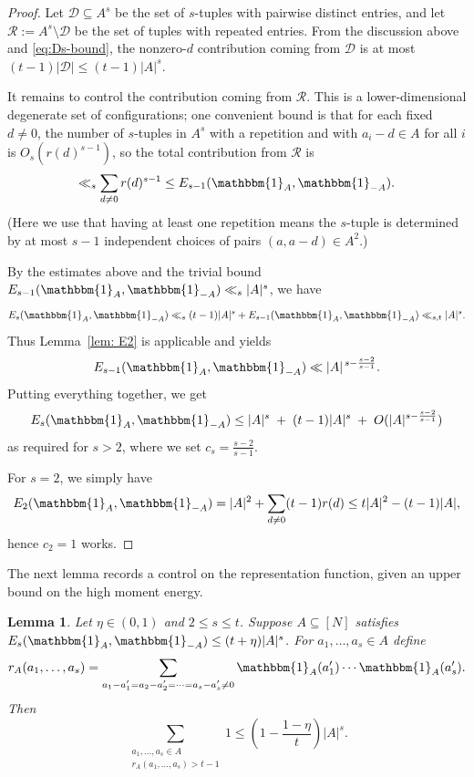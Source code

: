 \documentclass[A4paper,reqno,oneside,12pt]{amsart}
\theoremstyle{plain}
\newtheorem{lemma}[theorem]{Lemma}
\theoremstyle{definition}
\newcommand{\e}{\mathbbm{1}}          %
\begin{document}
\begin{proof}
Let $\mathcal{D}\subseteq A^s$ be the set of $s$-tuples with pairwise distinct entries, and let
$\mathcal{R}:=A^s\setminus\mathcal{D}$ be the set of tuples with  repeated entries.
From the discussion above and \eqref{eq:Ds-bound}, the nonzero-$d$ contribution coming from $\mathcal{D}$
is at most $(t-1)|\mathcal{D}|\le (t-1)|A|^s$.

It remains to control the contribution coming from $\mathcal{R}$. This is a lower-dimensional
degenerate set of configurations; one convenient bound is that for each fixed $d\neq 0$, the number
of $s$-tuples in $A^s$ with a repetition and with $a_i-d\in A$ for all $i$ is $O_s(r(d)^{s-1})$,
so the total contribution from $\mathcal{R}$ is
\[
\ll_s \sum_{d\neq 0} r(d)^{s-1}\leq E_{s-1}(\e_A,\e_{-A}).
\]
(Here we use that having at least one repetition means the $s$-tuple is determined by at most $s-1$
independent choices of pairs $(a,a-d)\in A^2$.)

By the estimates above and the trivial bound $ E_{s-1}(\e_A,\e_{-A})\ll_{s} |A|^{s}$, we have 
\begin{equation*}\label{eqn: Es}
E_s(\e_A,\e_{-A})\ll_{s}  (t-1)|A|^{s} + E_{s-1}(\e_A,\e_{-A})\ll_{s, t} |A|^{s}.    
\end{equation*}
 Thus 
Lemma~\ref{lem: E2} is applicable and yields
\[
E_{s-1}(\e_A,\e_{-A})\ll |A|^{\,s-\frac{s-2}{s-1}}.
\]
Putting everything together, we get
\[
E_s(\e_A,\e_{-A})
\le |A|^s \;+\; (t-1)|A|^s \;+\; O(|A|^{s-\frac{s-2}{s-1}})
\]
as required for $s>2$, where we set $c_s = \frac{s-2}{s-1}$.

For $s=2$, we simply have 
\[
E_2(\e_A,\e_{-A})=|A|^2 +\sum_{d\neq0} (t-1)r(d) \leq t|A|^2 - (t-1)|A|,
\]
hence $c_2=1$ works. 
\end{proof}
The next lemma records a control on the  representation function, given an upper bound on the high moment energy. 
\begin{lemma}\label{lem:rA-large} Let $\eta\in(0,1)$ and $2\le s\le t$.   
Suppose $A\subseteq [N]$ satisfies $E_s(\e_A,\e_{-A})\leq (t+\eta)|A|^s$.
For $a_1,\dots,a_s\in A$ define
\[
r_{A}(a_1,\dots,a_s)=\sum_{\substack{a_1-a_1'=a_2-a_2'=\cdots = a_s-a_s'\neq 0}}\e_A(a_1')\cdots \e_A(a_{s}').
\]
Then
\[
\sum_{\substack{a_1,\dots,a_s\in A\\ r_{A}(a_1,\dots,a_s)>t-1}} 1
\leq \left(1-\frac{1-\eta}{t}\right) |A|^{s}. 
\]
\end{lemma}
\end{document}
